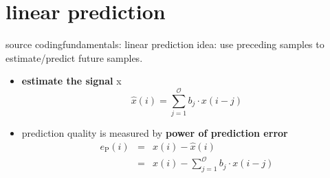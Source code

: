 \section{linear prediction}
	\begin{frame}{source coding}{fundamentals: linear prediction}
		idea: use preceding samples to estimate/predict future samples.
		\begin{itemize}
			\item	\textbf{estimate the signal} x
				\begin{equation*}
					\hat{x}(i) = \sum\limits_{j=1}^{\mathcal{O}}{b_j\cdot x(i-j)}
				\end{equation*}
			\pause
			\item	prediction quality is measured by \textbf{power of prediction error}
				\begin{eqnarray*}
					e_{\mathrm{P}}(i)	&=& x(i)-\hat{x}(i)\\
							&=& x(i) - \sum\limits_{j=1}^{\mathcal{O}}{b_j\cdot x(i-j)}
				\end{eqnarray*}
		\end{itemize}						
	\end{frame}
